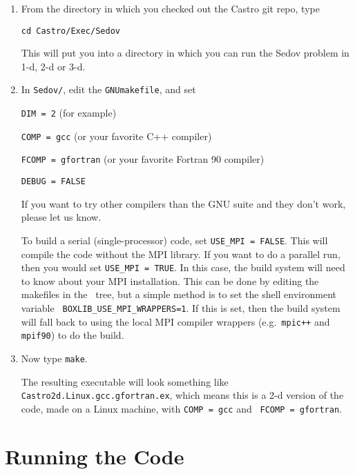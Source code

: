 \begin{enumerate}

\item From the directory in which you checked out the Castro git repo,
  type
\begin{verbatim}
cd Castro/Exec/Sedov
\end{verbatim}
This will put you into a directory in which you can run the Sedov
problem in 1-d, 2-d or 3-d.

\item In {\tt Sedov/}, edit the {\tt GNUmakefile}, and set

{\tt DIM = 2} (for example)

{\tt COMP = gcc} (or your favorite C++ compiler)

{\tt FCOMP = gfortran} (or your favorite Fortran 90 compiler)

{\tt DEBUG = FALSE}

If you want to try other compilers than the GNU suite and they don't
work, please let us know.

To build a serial (single-processor) code, set {\tt USE\_MPI = FALSE}.
This will compile the code without the MPI library.  If you want to do
a parallel run, then you would set {\tt USE\_MPI = TRUE}.  In this
case, the build system will need to know about your MPI installation.
This can be done by editing the makefiles in the \boxlib\ tree, but a
simple method is to set the shell environment variable {\tt
  BOXLIB\_USE\_MPI\_WRAPPERS=1}.  If this is set, then the build
system will fall back to using the local MPI compiler wrappers
(e.g.\ {\tt mpic++} and {\tt mpif90}) to do the build.

\item Now type {\tt make}.

  The resulting executable will look something like {\tt
    Castro2d.Linux.gcc.gfortran.ex}, which means this is a 2-d version
  of the code, made on a Linux machine, with {\tt COMP = gcc} and {\tt
    FCOMP = gfortran}.

\end{enumerate}

\section{Running the Code}

